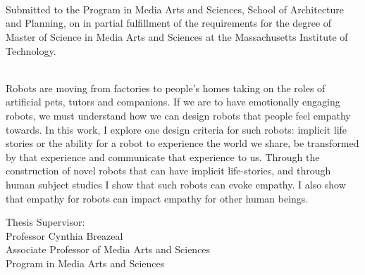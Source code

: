 \begin{titlepage}
      {\setlength{\parindent}{0cm}
        \large  


        \hfill


        \begingroup

            \color{Maroon}\spacedallcaps{\myTitle} \\ 
            \mySubtitle \\ 

            \bigskip
        \endgroup

        \spacedlowsmallcaps{\myName}\\ \medskip

   Submitted to the Program in Media Arts and Sciences, School of Architecture and Planning, on \myTime in partial fulfillment of the requirements for the degree of Master of Science in Media Arts and Sciences at the Massachusetts Institute of Technology. \\ 

\bigskip
{}\\ \medskip

Robots are moving from factories to people's homes taking on the roles of artificial pets, tutors and companions. If we are to have emotionally engaging robots, we must understand how we can design robots that people feel empathy towards. In this work, I explore one design criteria for such robots: implicit life stories or the ability for a robot to experience the world we share, be transformed by that experience and communicate that experience to us. Through the construction of novel robots that can have implicit life-stories, and through human subject studies I show that such robots can evoke empathy. I also show that empathy for robots can impact empathy for other human beings. \\ \bigskip

\vfill

Thesis Supervisor:\\
Professor Cynthia Breazeal\\
Associate Professor of Media Arts and Sciences\\
Program in Media Arts and Sciences

        }
\end{titlepage}   
